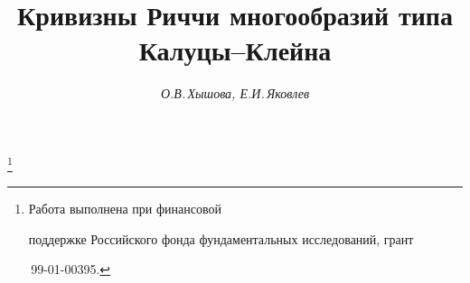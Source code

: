 




%





\newcommand{\grad}{\operatorname{grad}}


\newcommand{\Ri}{\operatorname{Ri}}


\newcommand{\rank}{\operatorname{rank}}


\newcommand{\im}{\operatorname{im}}


\newcommand{\He}{\operatorname{He}}


\renewcommand{\div}{\operatorname{div}}


\newcommand{\p}{\partial}


\newcommand{\tr}{\operatorname{tr}}


\newcommand{\R}{{\bold R}}


\newcommand{\Z}{{\bold Z}}


\newcommand{\g}{\ov g}


\newcommand{\tts}[1]{}


\renewcommand{\baselinestretch}{0.97}







\setcounter{page}{58}















\author{\it О.В.\,Хышова, Е.И.\,Яковлев}




\title{Кривизны Риччи многообразий типа Калуцы--Клейна}


\thanks{Работа выполнена при финансовой


поддержке Российского фонда фундаментальных исследований, грант


\No\,99-01-00395.}





